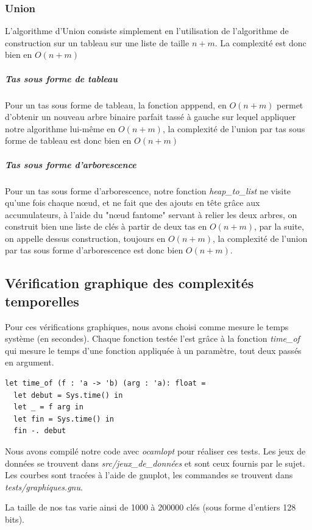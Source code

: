 \documentclass[12pt,a4paper]{article}
\begin{document}
\subsubsection{Union}

L'algorithme d'Union consiste simplement en l'utilisation de l'algorithme de construction sur un tableau sur une liste de taille $n+m$. La complexité est donc bien en $O(n+m)$
\subparagraph{Tas sous forme de tableau}
Pour un tas sous forme de tableau, la fonction apppend, en $O(n+m)$ permet d'obtenir un nouveau arbre binaire parfait tassé à gauche sur lequel appliquer notre algorithme lui-même en $O(n+m)$, la complexité de l'union par tas sous forme de tableau est donc bien en $O(n+m)$

\subparagraph{Tas sous forme d'arborescence}

Pour un tas sous forme d'arborescence, notre fonction \textit{heap\_to\_list} ne visite qu'une fois chaque nœud, et ne fait que des ajouts en tête grâce aux accumulateurs, à l'aide du "nœud fantome" servant à relier les deux arbres, on construit bien une liste de clés à partir de deux tas en $O(n+m)$, par la suite, on appelle dessus construction, toujours en $O(n+m)$, la complexité de l'union par tas sous forme d'arborescence est donc bien $O(n+m)$.


\subsection{Vérification graphique des complexités temporelles}
Pour ces vérifications graphiques, nous avons choisi comme mesure le temps système (en secondes). Chaque fonction testée l'est grâce à la fonction \textit{time\_of} qui mesure le temps d'une fonction appliquée à un paramètre, tout deux passés en argument.

\bigskip \begin{lstlisting}
let time_of (f : 'a -> 'b) (arg : 'a): float =
  let debut = Sys.time() in
  let _ = f arg in
  let fin = Sys.time() in
  fin -. debut
\end{lstlisting} \bigskip

Nous avons compilé notre code avec \textit{ocamlopt} pour réaliser ces tests. Les jeux de données se trouvent dans \textit{src/jeux\_de\_données} et sont ceux fournis par le sujet. Les courbes sont tracées à l'aide de gnuplot, les commandes se trouvent dans \textit{tests/graphiques.gnu}.

La taille de nos tas varie ainsi de 1000 à 200000 clés (sous forme d'entiers 128 bits).
\end{document}
